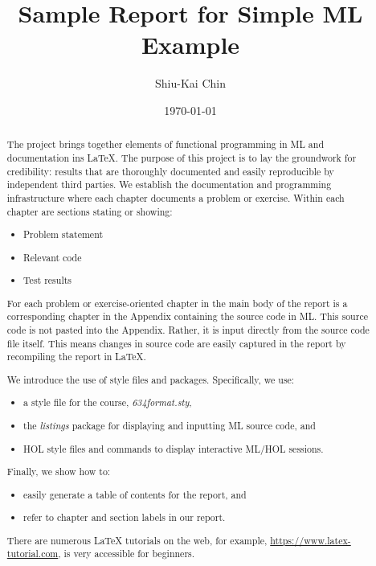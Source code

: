 \documentclass{report}
\title{Sample Report for Simple ML Example}
\author{Shiu-Kai Chin}
\date{\today}
\begin{document}
\lstset{language=ML}


\maketitle{}

\begin{abstract}
  The project brings together elements of functional programming in ML
  and documentation ins \LaTeX{}.  The purpose of this project is to
  lay the groundwork for credibility: results that are thoroughly
  documented and easily reproducible by independent third parties. We
  establish the documentation and programming infrastructure where
  each chapter documents a problem or exercise.  Within each chapter
  are sections stating or showing:
  \begin{itemize}
  \item Problem statement
  \item Relevant code
  \item Test results 
  \end{itemize}
  
  For each problem or exercise-oriented chapter in the main body of
  the report is a corresponding chapter in the Appendix containing the
  source code in ML.  This source code is not pasted into the
  Appendix.  Rather, it is input directly from the source code file
  itself. This means changes in source code are easily captured in the
  report by recompiling the report in \LaTeX{}.

  We introduce the use of style files and packages. Specifically, we use:
  \begin{itemize}
  \item a style file for the course, \emph{634format.sty}, 
  \item the \emph{listings} package for displaying and inputting ML
    source code, and
  \item HOL style files and commands to display interactive ML/HOL
    sessions.
  \end{itemize}

  Finally, we show how to:
  \begin{itemize}
  \item easily generate a table of contents for the report, and
  \item refer to chapter and section labels in our report.
  \end{itemize}

  There are numerous \LaTeX{} tutorials on the web, for example,
  \url{https://www.latex-tutorial.com}, is very accessible for
  beginners.

\end{abstract}
\end{document}
